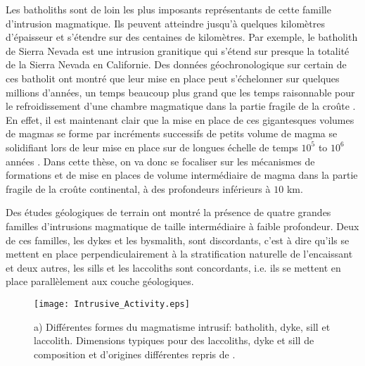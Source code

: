 Les batholiths sont de loin  les plus imposants représentants de cette
famille  d'intrusion   magmatique.   Ils  peuvent   atteindre  jusqu'à
quelques  kilomètres d'épaisseur  et  s'étendre sur  des centaines  de
kilomètres.   Par  exemple, le  batholith  de  Sierra Nevada  est  une
intrusion granitique qui s'étend sur  presque la totalité de la Sierra
Nevada en Californie. Des données  géochronologique sur certain de ces
batholit  ont montré  que leur  mise  en place  peut s'échelonner  sur
quelques millions d'années, un temps beaucoup plus grand que les temps
raisonnable pour  le refroidissement d'une chambre  magmatique dans la
partie fragile de  la croûte \citep{Glazner:2004gv}. En  effet, il est
maintenant clair que  la mise en place de ces  gigantesques volumes de
magmas se forme par incréments successifs de petits volume de magma se
solidifiant lors de leur mise en place sur de longues échelle de temps
$10^5$ to  $10^6$ années  \citep{Petford:2000cc,Glazner:2004gv}.  Dans
cette thèse, on va donc se  focaliser sur les mécanismes de formations
et de mise  en places de volume intermédiaire de  magma dans la partie
fragile de la croûte continental,  à des profondeurs inférieurs à $10$
km.

Des études  géologiques de  terrain ont montré  la présence  de quatre
grandes  familles d'intrusions  magmatique de  taille intermédiaire  à
faible profondeur.  Deux de ces  familles, les dykes et les bysmalith,
sont  discordants,   c'est  à   dire  qu'ils   se  mettent   en  place
perpendiculairement à  la stratification naturelle de  l'encaissant et
deux autres, les sills et les laccoliths sont concordants, i.e. ils se
mettent en place parallèlement aux couche géologiques.

\begin{figure}[htpb]
  \begin{center}
    \graphicspath{ {/Users/thorey/Documents/These/Manuscript/Figure/Chapter1/} }
    \texttt{[image: Intrusive\_Activity.eps]}
    \caption{a) Différentes formes  du magmatisme intrusif: batholith,
      dyke,  sill   et  laccolith.    Dimensions  typiques   pour  des
      laccoliths,   dyke  et   sill  de   composition  et   d'origines
      différentes repris de \citet{Cruden:tg}. }
    \label{Dimension}
  \end{center}
\end{figure}

